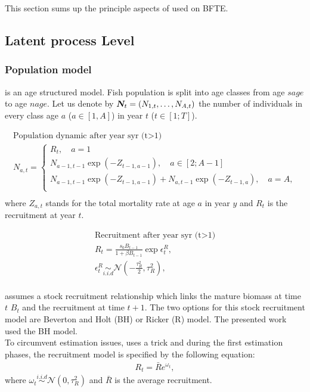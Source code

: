 This section  sums up the principle  aspects of \iscam used  on BFTE.
\subsection{Latent process Level}
\subsubsection{Population model}
\iscam is an age structured model.  Fish population is split into age classes from
age $sage$ to age $nage$. Let us denote by $\boldsymbol N_t = (N_{1,t}, \ldots, N_{A,t})$ the number
of individuals in every class age $a$ ($a\in [1,A]$) in year $t$ ($t\in [1;T]$).

\begin{gather}
  \mbox{Population dynamic after year syr (t>1)}\\
  N_{a,t}= \left\lbrace 
    \begin{array}{l}
      R_t, \quad a=1\\
      N_{a-1,t-1} \exp(-Z_{t-1, a-1}), \quad a\in [2;A-1]\\
      N_{a-1,t-1} \exp(-Z_{t-1, a-1}) + N_{a,t-1} \exp(-Z_{t-1, a}), \quad a=A,\\
    \end{array}  \right. \\
\end{gather}
 where $Z_{a,t}$  stands for the total  mortality rate at age  $a$ in
  year $y$ and $R_t$ is the recruitment at year $t$.




\begin{gather}
\mbox{Recruitment after year syr (t>1)}\\
R_t= \frac{s_0 B_{t-1}}{1+\beta B_{t-1}} \exp{\epsilon^R_t}, \\
\epsilon^R_t\underset{i.i.d}{\sim}\mathcal{N}\left(-\frac{\tau_R^2}{2}, \tau_R^2\right),\\
\label{eq:iscamBev}
\end{gather} 

\iscam assumes a stock recruitment relationship which links the mature biomass at
time $t$ $B_t$ and the recruitment at time $t+1$. The two options for this stock recruitment model are  Beverton and Holt
(BH) or Ricker (R) model. The presented work used the BH model.  \\

To circumvent estimation issues, \iscam uses a trick and  during the first estimation phases, the recruitment
model is specified by the following equation:
\begin{gather}
\label{eq:iscamRec}  R_t =\bar{R}e^{\omega_t},
\end{gather}
where  $\omega_t\overset{i.i.d}{\sim}  \mathcal{N}(0,  \tau^2_R)$  and
$\bar{R}$ is the average recruitment. 

